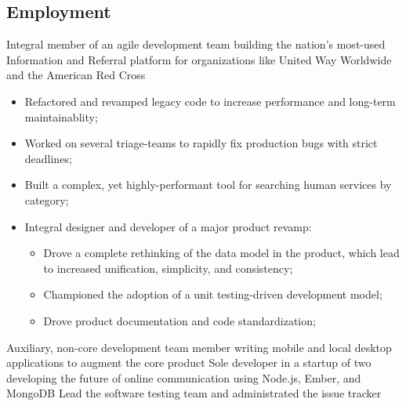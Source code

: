 \documentclass[10pt,a4paper,sans]{moderncv}        %
\begin{document}
\subsection{Employment}
    {Integral member of an agile development team building the nation's most-used Information
    and Referral platform for organizations like United Way Worldwide and the American Red
    Cross\newline{}
\begin{itemize}
\item Refactored and revamped legacy code to increase performance and long-term
    maintainablity;
\item Worked on several triage-teams to rapidly fix production bugs with strict deadlines;
\item Built a complex, yet highly-performant tool for searching human services by category;
\item Integral designer and developer of a major product revamp:
  \begin{itemize}
  \item Drove a complete rethinking of the data model in the product, which lead to increased
        unification, simplicity, and consistency;
  \item Championed the adoption of a unit testing-driven development model;
  \item Drove product documentation and code standardization;
  \end{itemize}
\end{itemize}}
    {Auxiliary, non-core development team member writing mobile and local desktop
    applications to augment the core product\newline{}}
    {Sole developer in a startup of two developing the future of online communication using
    Node.js, Ember, and MongoDB}
    {Lead the software testing team and administrated the issue tracker}
\end{document}
